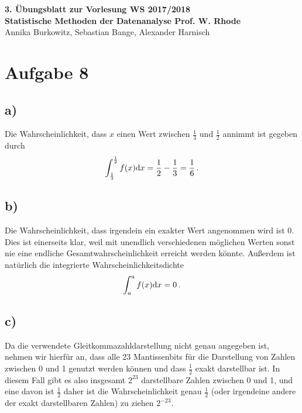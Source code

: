 \documentclass[a4paper, 11pt]{article}
\begin{document}
\noindent
\large{\textbf{3. Übungsblatt zur Vorlesung \hfill WS 2017/2018 \\
Statistische Methoden der Datenanalyse \hfill Prof. W. Rhode}} \\
Annika Burkowitz, Sebastian Bange, Alexander Harnisch \\
\noindent\makebox[\linewidth]{\rule{\textwidth}{0.4pt}}

\section*{Aufgabe 8}
\subsection*{a)}
Die Wahrscheinlichkeit, dass $x$ einen Wert zwischen $\frac{1}{3}$ und $\frac{1}{2}$ annimmt ist gegeben durch
\begin{equation}
    \int_{\frac{1}{3}}^{\frac{1}{2}} f(x) \textup{d}x = \frac{1}{2} - \frac{1}{3} = \frac{1}{6} \,.
\end{equation}

\subsection*{b)}
Die Wahrscheinlichkeit, dass irgendein ein exakter Wert angenommen wird ist 0. Dies ist einerseits klar, weil mit unendlich verschiedenen möglichen Werten sonst nie eine endliche Gesamtwahrscheinlichkeit erreicht werden könnte. Außerdem ist natürlich die integrierte Wahrscheinlichkeitsdichte
\begin{equation}
    \int_{a}^{a} f(x) \textup{d}x = 0 \,.
\end{equation}

\subsection*{c)}
Da die verwendete Gleitkommazahldarstellung nicht genau angegeben ist, nehmen wir hierfür an, dass alle 23 Mantissenbits für die Darstellung von Zahlen zwischen 0 und 1 genutzt werden können und dass $\frac{1}{2}$ exakt darstellbar ist. In diesem Fall gibt es also insgesamt $2^{23}$ darstellbare Zahlen zwischen 0 und 1, und eine davon ist $\frac{1}{2}$ daher ist die Wahrscheinlichkeit genau $\frac{1}{2}$ (oder irgendeine andere der exakt darstellbaren Zahlen) zu ziehen $2^{-23}$.
\end{document}
